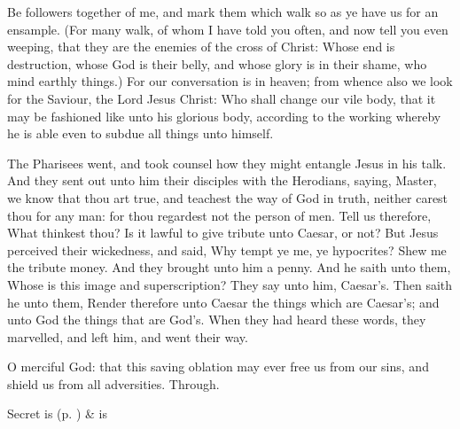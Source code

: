  Be followers together of me, and mark them which walk so as ye have us for an ensample. (For many walk, of whom I have told you often, and now tell you even weeping, that they are the enemies of the cross of Christ: Whose end is destruction, whose God is their belly, and whose glory is in their shame, who mind earthly things.) For our conversation is in heaven; from whence also we look for the Saviour, the Lord Jesus Christ: Who shall change our vile body, that it may be fashioned like unto his glorious body, according to the working whereby he is able even to subdue all things unto himself.



 The Pharisees went, and took counsel how they might entangle Jesus in his talk. And they sent out unto him their disciples with the Herodians, saying, Master, we know that thou art true, and teachest the way of God in truth, neither carest thou for any man: for thou regardest not the person of men. Tell us therefore, What thinkest thou? Is it lawful to give tribute unto Caesar, or not? But Jesus perceived their wickedness, and said, Why tempt ye me, ye hypocrites? Shew me the tribute money. And they brought unto him a penny. And he saith unto them, Whose is this image and superscription? They say unto him, Caesar's. Then saith he unto them, Render therefore unto Caesar the things which are Caesar's; and unto God the things that are God's. When they had heard these words, they marvelled, and left him, and went their way.


\secret
{} O merciful God: that this saving oblation may ever free us from our sins, and shield us from all adversities. Through.
\begin{rubric}
     Secret is  (p. \pageref{SPSaints}) \&  is 
\end{rubric}

